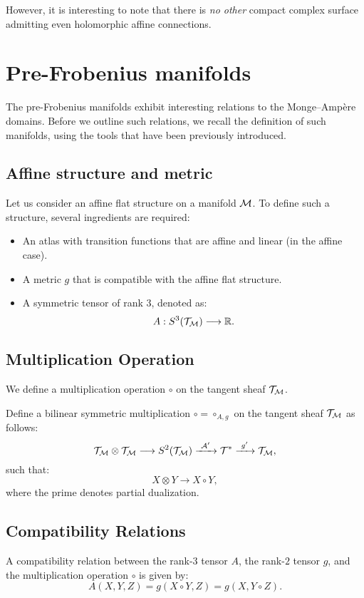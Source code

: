 However, it is interesting to note that there is {\it no other} compact complex surface admitting even holomorphic affine connections.


\section{Pre-Frobenius manifolds}
The pre-Frobenius manifolds exhibit interesting relations to the Monge--Ampère domains. Before we outline such relations, we recall the definition of such manifolds, using the tools that have been previously introduced.  

\subsection{Affine structure and metric}
Let us consider an affine flat structure on a manifold $\mathcal{M}$. To define such a structure, several ingredients are required:
\begin{itemize}
    \item An atlas with transition functions that are affine and linear (in the affine case).
    \item A metric $g$ that is compatible with the affine flat structure.
    \item A symmetric tensor of rank $3$, denoted as:
    \[
    A: S^3(\mathcal{T}_{\mathcal{M}}) \longrightarrow \mathbb{R}.
    \]
    
  
\end{itemize}


\subsection{Multiplication Operation } 
We define a multiplication operation $\circ$ on the tangent sheaf $\mathcal{T}_{\mathcal{M}}$.


 Define a bilinear symmetric multiplication $\circ = \circ_{A, g}$ on the tangent sheaf $\mathcal{T}_{\mathcal{M}}$ as follows:
\[
\mathcal{T}_{\mathcal{M}} \otimes \mathcal{T}_{\mathcal{M}} \longrightarrow S^2(\mathcal{T}_{\mathcal{M}}) \xrightarrow{\ \mathcal{A}' \ } {\mathcal{T}}^* \xrightarrow{\ g' \ } \mathcal{T}_{\mathcal{M}},
\]
such that:
\[
X \otimes Y \longrightarrow X \circ Y,
\]
where the prime denotes partial dualization. 


\subsection{Compatibility Relations}
A compatibility relation between the rank-$3$ tensor $A$, the rank-$2$ tensor $g$, and the multiplication operation $\circ$ is given by:
    \[
    A(X, Y, Z) = g(X \circ Y, Z) = g(X, Y \circ Z).
    \]

